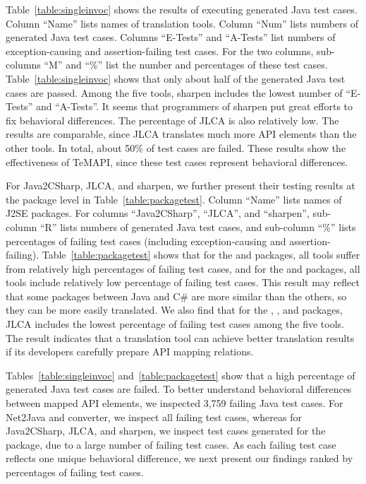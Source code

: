 Table~\ref{table:singleinvoc} shows the results of executing generated Java test cases. Column ``Name'' lists names of translation tools. Column ``Num'' lists numbers of generated Java test cases. Columns ``E-Tests'' and ``A-Tests'' list numbers of exception-causing and assertion-failing test cases. For the two columns, sub-columns ``M'' and ``\%'' list the number and percentages of these test cases. Table~\ref{table:singleinvoc} shows that only about half of the generated Java test cases are passed. Among the five tools, sharpen includes the lowest number of ``E-Tests'' and ``A-Tests''. It seems that programmers of sharpen put great efforts to fix behavioral differences. The percentage of JLCA is also relatively low. The results are comparable, since JLCA translates much more API elements than the other tools. In total, about 50\% of test cases are failed. These results show the effectiveness of TeMAPI, since these test cases represent behavioral differences.


For Java2CSharp, JLCA, and sharpen, we further present their testing results at the package level in Table~\ref{table:packagetest}. Column ``Name'' lists names of J2SE packages. For columns ``Java2CSharp'', ``JLCA'', and ``sharpen'', sub-column ``R'' lists numbers of generated Java test cases, and sub-column ``\%'' lists percentages of failing test cases (including exception-causing and assertion-failing). Table~\ref{table:packagetest} shows that for the  and  packages, all tools suffer from relatively high percentages of failing test cases, and for the  and  packages, all tools include relatively low percentage of failing test cases. This result may reflect that some packages between Java and C\# are more similar than the others, so they can be more easily translated. We also find that for the , , and  packages, JLCA includes the lowest percentage of failing test cases among the five tools. The result indicates that a translation tool can achieve better translation results if its developers carefully prepare API mapping relations.

Tables~\ref{table:singleinvoc} and~\ref{table:packagetest} show that a high percentage of generated Java test cases are failed. To better understand behavioral differences between mapped API elements, we inspected 3,759 failing Java test cases. For Net2Java and converter, we inspect all failing test cases, whereas for Java2CSharp, JLCA, and sharpen, we inspect test cases generated for the  package, due to a large number of failing test cases. As each failing test case reflects one unique behavioral difference, we next present our findings ranked by percentages of failing test cases.

